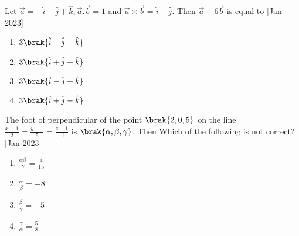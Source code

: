     \item Let $\overrightarrow{a}=-\hat{i}-\hat{j}+\hat{k}, \overrightarrow{a}.\overrightarrow{b}=1$ and $\overrightarrow{a}\times \overrightarrow{b}=\hat{i}-\hat{j}$. Then $\overrightarrow{a}-6\overrightarrow{b}$ is equal to 
     \hfill{[Jan 2023]}
		\begin{multicols}{1}
			\begin{enumerate}
				\item $3\brak{\hat{i}-\hat{j}-\hat{k}}$
    \item $3\brak{\hat{i}+\hat{j}+\hat{k}}$
    \item $3\brak{\hat{i}-\hat{j}+\hat{k}}$
    \item $3\brak{\hat{i}+\hat{j}-\hat{k}}$
			\end{enumerate}
		\end{multicols}

    \item The foot of perpendicular of the point $\brak{2,0,5}$ on the line $\frac{x+1}{2}=\frac{y-1}{5}=\frac{z+1}{-1}$ is $\brak{\alpha,\beta,\gamma}$. Then Which of the following is not correct?
     \hfill{[Jan 2023]}
		\begin{multicols}{1}
			\begin{enumerate}
				
				\item $\frac{\alpha \beta}{\gamma}=\frac{4}{15}$
    \item $\frac{\alpha }{\beta}=-8$
     \item $\frac{\beta }{\gamma}=-5$
      \item $\frac{\gamma }{\alpha}=\frac{5}{8}$
			\end{enumerate}
		\end{multicols}

